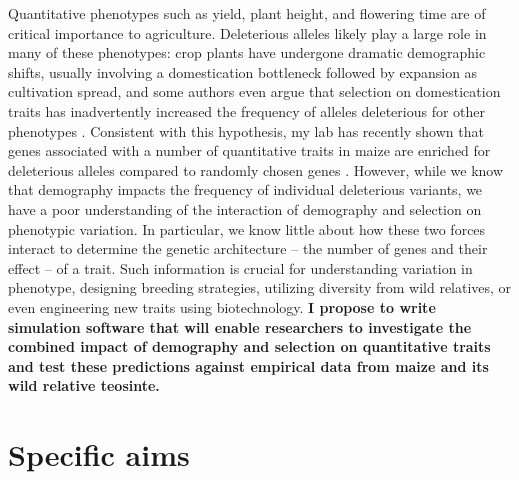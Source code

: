 Quantitative phenotypes such as yield, plant height, and flowering time are of critical importance to agriculture.  
Deleterious alleles likely play a large role in many of these phenotypes: crop plants have undergone dramatic demographic shifts, usually involving a domestication bottleneck followed by expansion as cultivation spread, and some authors even argue that selection on domestication traits has inadvertently increased the frequency of alleles deleterious for other phenotypes \citep{gunther2010deleterious}. 
Consistent with this hypothesis, my lab has recently shown that genes associated with a number of quantitative traits in maize are enriched for deleterious alleles  compared to randomly chosen genes \citep{mezmouk2014pattern}. 
However, while we know that demography impacts the frequency of individual deleterious variants, we have a poor understanding of the interaction of demography and selection on phenotypic variation. 
In particular, we know little about how these two forces interact to determine the genetic architecture -- the number of genes and their effect -- of a trait. 
Such information is crucial for understanding variation in phenotype, designing breeding strategies, utilizing diversity from wild relatives, or even engineering new traits using biotechnology. 
{\bf I propose to write simulation software that will enable researchers to investigate the combined impact of demography and selection on quantitative traits and test these predictions against empirical data from maize and its wild relative teosinte.}


\section*{Specific aims}

